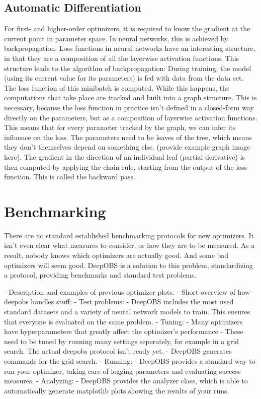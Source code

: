 \documentclass[twoside,12pt,a4paper]{report}
\begin{document}
\subsection{Automatic Differentiation}
For first- and higher-order optimizers, it is required to know the gradient at the current point in parameter space. In neural networks, this is achieved by backpropagation.
Loss functions in neural networks have an interesting structure, in that they are a composition of all the layerwise activation functions. This structure leads to the algorithm of backpropagation:
During training, the model (using its current value for its parameters) is fed with data from the data set. The loss function of this minibatch is computed. While this happens, the computations that take place are tracked and built into a graph structure. This is necessary, because the loss function in practice isn't defined in a closed-form way directly on the parameters, but as a composition of layerwise activation functions. This means that for every parameter tracked by the graph, we can infer its influence on the loss. The parameters need to be leaves of the tree, which means they don't themselves depend on something else. (provide example graph image here).
The gradient in the direction of an individual leaf (partial derivative) is then computed by applying the chain rule, starting from the output of the loss function. This is called the backward pass.



\section{Benchmarking}
\begin{markdown}
There are no standard established benchmarking protocols for new optimizers. It isn't even clear what measures to consider, or how they are to be measured. As a result, nobody knows which optimizers are actually good. And some bad optimizers will seem good.
DeepOBS is a solution to this problem, standardizing a protocol, providing benchmarks and standard test problems.

- Description and examples of previous optimizer plots.
- Short overview of how deepobs handles stuff:
    - Test problems:
      	- DeepOBS includes the most used standard datasets and a variety of neural network models to train. This ensures that everyone is evaluated on the same problem.
    - Tuning:
    	- Many optimizers have hyperparameters that greatly affect the optimizer's performance
 	    - These need to be tuned by running many settings seperately, for example in a grid search. The actual deepobs protocol isn't ready yet.
      - DeepOBS generates commands for the grid search.
    - Running:
      	- DeepOBS provides a standard way to run your optimizer, taking care of logging parameters and evaluating success measures.
    - Analyzing:
      	- DeepOBS provides the analyzer class, which is able to automatically generate matplotlib plots showing the results of your runs.
\end{markdown}
\end{document}
